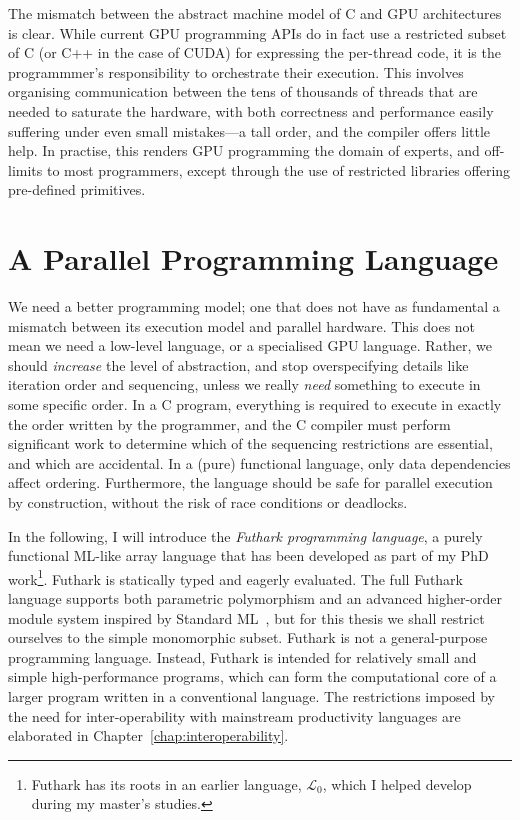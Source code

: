 The mismatch between the abstract machine model of C and GPU
architectures is clear.  While current GPU programming APIs do in fact
use a restricted subset of C (or C++ in the case of CUDA) for
expressing the per-thread code, it is the programmmer's responsibility
to orchestrate their execution.  This involves organising
communication between the tens of thousands of threads that are needed
to saturate the hardware, with both correctness and performance easily
suffering under even small mistakes---a tall order, and the compiler
offers little help.  In practise, this renders GPU programming the
domain of experts, and off-limits to most programmers, except through
the use of restricted libraries offering pre-defined primitives.

\section{A Parallel Programming Language}

We need a better programming model; one that does not have as
fundamental a mismatch between its execution model and parallel
hardware.  This does not mean we need a low-level language, or a
specialised GPU language.  Rather, we should \textit{increase} the
level of abstraction, and stop overspecifying details like iteration
order and sequencing, unless we really \textit{need} something to
execute in some specific order.  In a C program, everything is
required to execute in exactly the order written by the programmer,
and the C compiler must perform significant work to determine which
of the sequencing restrictions are essential, and which are
accidental.  In a (pure) functional language, only data dependencies
affect ordering.  Furthermore, the language should be safe for
parallel execution by construction, without the risk of race
conditions or deadlocks.

In the following, I will introduce the \textit{Futhark programming
  language}, a purely functional ML-like array language that has been
developed as part of my PhD work\footnote{Futhark has its roots in an
  earlier language, $\mathcal{L}_0$, which I helped develop during my
  master's studies.}.  Futhark is statically typed and eagerly
evaluated.  The full Futhark language supports both parametric
polymorphism and an advanced higher-order module system inspired by
Standard ML~\cite{Milner:1997:DSM:549659}, but for this thesis we
shall restrict ourselves to the simple monomorphic subset.  Futhark is
not a general-purpose programming language. Instead, Futhark is
intended for relatively small and simple high-performance programs,
which can form the computational core of a larger program written in a
conventional language.  The restrictions imposed by the need for
inter-operability with mainstream productivity languages are
elaborated in Chapter~\ref{chap:interoperability}.

